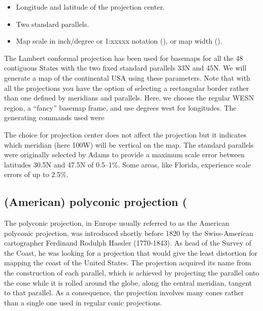 \begin{itemize}
\item Longitude and latitude of the projection center.
\item Two standard parallels.
\item Map scale in inch/degree or 1:xxxxx notation (), or map width ().
\end{itemize}

The Lambert conformal projection has been used for basemaps for all
the 48 contiguous States with the two fixed standard parallels
33\DS N and 45\DS N.  We will generate a map of the continental
USA using these parameters.  Note that with all the projections you
have the option of selecting a rectangular border rather than one
defined by meridians and parallels.  Here, we choose the regular WESN
region, a ``fancy'' basemap frame, and use degrees west for longitudes.
The generating commands used were



The choice for projection center does not affect the projection but
it indicates which meridian (here 100\DS W) will be vertical on
the map.  The standard parallels were originally selected by Adams
to provide a maximum scale error between latitudes 30.5\DS N and
47.5\DS N of 0.5--1\%.  Some areas, like Florida, experience scale
errors of up to 2.5\%.

\subsection{(American) polyconic projection ( }

The polyconic projection, in Europe usually referred to as the American polyconic projection, was introduced shortly before 1820 by the Swiss-American cartographer Ferdinand Rodulph Hassler (1770-1843). As head of the Survey of the Coast, he was looking for a projection that would give the least distortion for mapping the coast of the United States. The projection acquired its name from the construction of each parallel, which is achieved by projecting the parallel onto the cone while it is rolled around the globe, along the central meridian, tangent to that parallel. As a consequence, the projection involves many cones rather than a single one used in regular conic projections.

